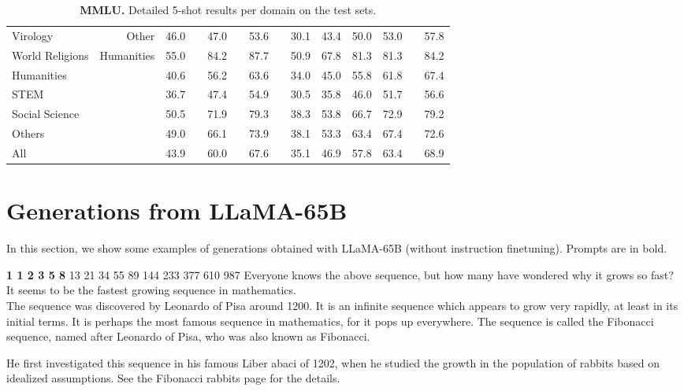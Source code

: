 \documentclass[11pt]{article}
\newcommand{\model}{LLaMA\xspace}
\begin{document}
\begin{table}
{\begin{tabular}{@{}lr cc cc cc cccc c c@{}}
Virology & Other & 46.0 && 47.0 && 53.6 && 30.1 & 43.4 & 50.0 & 53.0 && 57.8  \\
World Religions & Humanities & 55.0 && 84.2 && 87.7 && 50.9 & 67.8 & 81.3 & 81.3 && 84.2  \\ \midrule
Humanities & & 40.6 && 56.2 && 63.6 && 34.0 & 45.0 & 55.8 & 61.8 && 67.4 \\
STEM & & 36.7 &&  47.4 && 54.9 && 30.5 & 35.8 & 46.0 & 51.7 && 56.6 \\
Social Science & & 50.5 && 71.9 && 79.3 && 38.3 & 53.8	 & 66.7 & 72.9 && 79.2  \\
Others & & 49.0 && 66.1 && 73.9 && 38.1 & 53.3 & 63.4 & 67.4 && 72.6 \\ \midrule
All & & 43.9 && 60.0 && 67.6 && 35.1 & 46.9 & 57.8 & 63.4 && 68.9 \\
    \bottomrule
  \end{tabular}}
  \caption{
    \textbf{MMLU.} Detailed 5-shot results per domain on the test sets.
    \label{tab:mmluapp}
  }
\end{table}

\clearpage

\section{Generations from \model-65B}
In this section, we show some examples of generations obtained with \model-65B (without instruction finetuning). Prompts are in bold.

\begin{framed}
\centering
\vspace{.5em}
 \begin{minipage}{.9\textwidth}
\textbf{1 1 2 3 5 8} 13 21 34 55 89 144 233 377 610 987
Everyone knows the above sequence, but how many have wondered why it grows so fast?
It seems to be the fastest growing sequence in mathematics.\\

The sequence was discovered by Leonardo of Pisa around 1200.
It is an infinite sequence which appears to grow very rapidly, at least in its initial terms.
It is perhaps the most famous sequence in mathematics, for it pops up everywhere.
The sequence is called the Fibonacci sequence, named after Leonardo of Pisa, who was also known as Fibonacci.

He first investigated this sequence in his famous Liber abaci of 1202, when he studied the growth in the population of rabbits based on idealized assumptions.
See the Fibonacci rabbits page for the details.

\end{minipage}
\vspace{.5em}
\end{framed}
\end{document}
